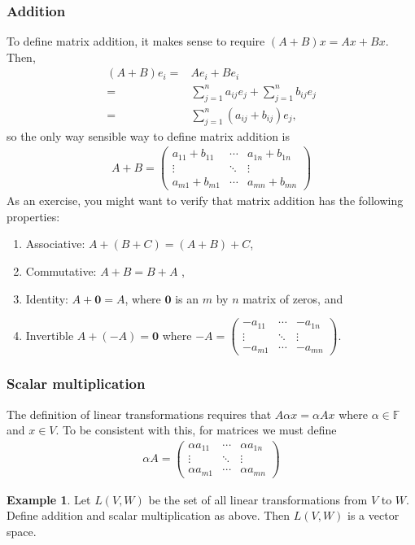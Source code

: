 \documentclass[12pt,reqno]{amsart}
\newcommand{\gmatrix}[1]{\begin{pmatrix} {#1}_{11} & \cdots &
    {#1}_{1n} \\ \vdots & \ddots & \vdots \\ {#1}_{m1} & \cdots &
    {#1}_{mn} \end{pmatrix}}
\theoremstyle{definition}
\newtheorem{example}{Example}[section]
\begin{document}
\subsubsection{Addition} 
To define matrix addition, it makes sense to
require $(A+B)x = Ax + Bx$. Then,
\begin{align*}
  (A + B) e_i = & A e_i + B e_i \\
  = & \sum_{j=1}^n a_{ij} e_j + \sum_{j=1}^n b_{ij} e_j\\
  = & \sum_{j=1}^n (a_{ij} + b_{ij}) e_j,
\end{align*}
so the only way sensible way to define matrix addition is 
\begin{align*}
  A + B = \begin{pmatrix} a_{11} + b_{11} & \cdots &
    a_{1n} + b_{1n}  \\ \vdots & \ddots & \vdots \\ a_{m1} + b_{m1} & \cdots &
    a_{mn}+b_{mn} \end{pmatrix}
\end{align*}
As an exercise, you might want to verify that matrix addition has the
following properties:
\begin{enumerate}
\item Associative: $A+(B + C) = (A+B) + C$,
\item Commutative: $A + B = B + A$ ,
\item Identity: $A + \mathbf{0} = A$, where $\mathbf{0}$ is an $m$ by
  $n$ matrix of zeros, and
\item Invertible $A + (-A) = \mathbf{0}$ where $-A = \gmatrix{-a}$.
\end{enumerate}

\subsubsection{Scalar multiplication}
The definition of linear transformations requires that $A \alpha x =
\alpha A x$ where $\alpha \in \mathbb{F}$ and $x \in V$. To be
consistent with this, for matrices we must define
\begin{align*}
  \alpha A = \begin{pmatrix} \alpha a_{11} & \cdots &
    \alpha a_{1n} \\ \vdots & \ddots & \vdots \\ \alpha a_{m1} & \cdots &
    \alpha a_{mn} \end{pmatrix}
\end{align*}

\begin{example}
  Let $L(V,W)$ be the set of all linear transformations from $V$ to
  $W$. Define addition and scalar multiplication as above. Then 
  $L(V,W)$ is a vector space.
\end{example}
\end{document}
